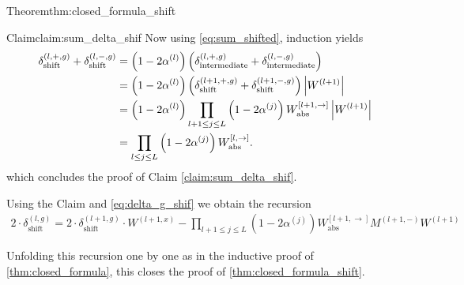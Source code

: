 \begin{proofref}{Theorem}{thm:closed_formula_shift}
\begin{proofref}{Claim}{claim:sum_delta_shif}
        Now using \cref{eq:sum_shifted}, induction yields
        \begin{align}
            \delta_{\text{shift}}^{(l,+,g)} + \delta_{\text{shift}}^{(l,-,g)}
                &= \left( 1 - 2 \alpha^{(l)} \right) \left( \delta_{\text{intermediate}}^{(l,+,g)} + \delta_{\text{intermediate}}^{(l,-,g)} \right) \notag\\
                &= \left( 1 - 2 \alpha^{(l)} \right) \left( \delta_{\text{shift}}^{(l+1,+,g)} + \delta_{\text{shift}}^{(l+1,-,g)} \right) \left|W^{(l+1)}\right| \notag\\
                &= \left( 1 - 2 \alpha^{(l)} \right) \prod_{l+1 \leq j \leq L} \left( 1 - 2 \alpha^{(j)} \right) W_{\text{abs}}^{[l+1, \rightarrow]} \left|W^{(l+1)}\right| \notag\\
                &= \prod_{l \leq j \leq L} \left( 1 - 2 \alpha^{(j)} \right) W_{\text{abs}}^{[l, \rightarrow]}.
        \end{align}
        which concludes the proof of Claim \ref{claim:sum_delta_shif}.
    \end{proofref}

    Using the Claim and \cref{eq:delta_g_shif} we obtain the recursion
    \begin{align}
        2 \cdot \delta_{\text{shift}}^{(l,g)}
            = 2 \cdot \delta_{\text{shift}}^{(l+1, g)} \cdot W^{(l+1,x)}
                - \prod_{l+1 \leq j \leq L} \left( 1 - 2 \alpha^{(j)} \right) W_{\text{abs}}^{[l+1, \rightarrow]} M^{(l+1, -)} W^{(l+1)} \label{eq:delta_g_shif_recursion}
    \end{align}


    Unfolding this recursion one by one as in the inductive proof of \cref{thm:closed_formula}, this closes the proof of \cref{thm:closed_formula_shift}.
\end{proofref}
